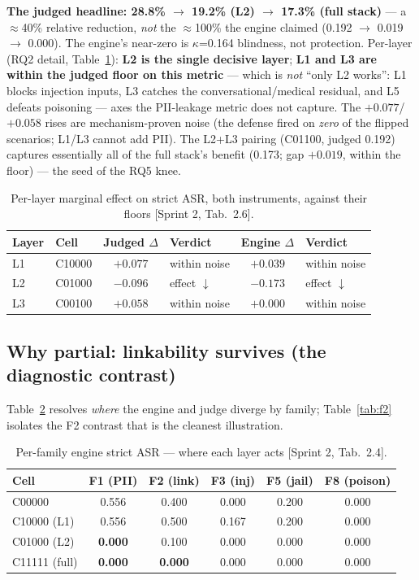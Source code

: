 \documentclass[11pt,a4paper]{article}
\newcommand{\kp}{\ensuremath{\kappa}}
\newcommand{\src}[1]{{\footnotesize\textcolor{gray!55!black}{[#1]}}}
\begin{document}
\noindent\textbf{The judged headline: 28.8\% $\to$ 19.2\% (L2) $\to$ 17.3\% (full stack)} --- a
$\approx$40\% relative reduction, \emph{not} the $\approx$100\% the engine claimed (0.192 $\to$ 0.019
$\to$ 0.000). The engine's near-zero is \kp{}=0.164 blindness, not protection. Per-layer (RQ2 detail,
Table~\ref{tab:rq1}): \textbf{L2 is the single decisive layer}; \textbf{L1 and L3 are within the judged
floor on this metric} --- which is \emph{not} ``only L2 works'': L1 blocks injection inputs, L3 catches
the conversational/medical residual, and L5 defeats poisoning --- axes the PII-leakage metric does not
capture. The $+0.077$/$+0.058$ rises are mechanism-proven noise (the defense fired on \emph{zero} of the
flipped scenarios; L1/L3 cannot add PII). The L2+L3 pairing (C01100, judged 0.192) captures essentially
all of the full stack's benefit (0.173; gap $+0.019$, within the floor) --- the seed of the RQ5 knee.

\begin{table}[h]
\centering
\caption{Per-layer marginal effect on strict ASR, both instruments, against their floors
\src{Sprint 2, Tab.~2.6}.}
\label{tab:rq1}
\begin{tabular}{llclcl}
\toprule
\textbf{Layer} & \textbf{Cell} & \textbf{Judged $\Delta$} & \textbf{Verdict} & \textbf{Engine $\Delta$} & \textbf{Verdict}\\
\midrule
L1 & C10000 & $+0.077$ & within noise & $+0.039$ & within noise\\
L2 & C01000 & $-0.096$ & effect $\downarrow$ & $-0.173$ & effect $\downarrow$\\
L3 & C00100 & $+0.058$ & within noise & $+0.000$ & within noise\\
\bottomrule
\end{tabular}
\end{table}

\subsection{Why partial: linkability survives (the diagnostic contrast)}
Table~\ref{tab:perfam} resolves \emph{where} the engine and judge diverge by family;
Table~\ref{tab:f2} isolates the F2 contrast that is the cleanest illustration.

\begin{table}[h]
\centering
\caption{Per-family engine strict ASR --- where each layer acts \src{Sprint 2, Tab.~2.4}.}
\label{tab:perfam}
\begin{tabular}{lccccc}
\toprule
\textbf{Cell} & \textbf{F1 (PII)} & \textbf{F2 (link)} & \textbf{F3 (inj)} & \textbf{F5 (jail)} & \textbf{F8 (poison)}\\
\midrule
C00000 & 0.556 & 0.400 & 0.000 & 0.200 & 0.000\\
C10000 (L1) & 0.556 & 0.500 & 0.167 & 0.200 & 0.000\\
C01000 (L2) & \textbf{0.000} & 0.100 & 0.000 & 0.000 & 0.000\\
C11111 (full) & \textbf{0.000} & \textbf{0.000} & 0.000 & 0.000 & 0.000\\
\bottomrule
\end{tabular}
\end{table}
\end{document}
